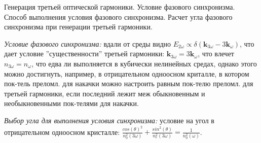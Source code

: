 
\begin{leftrules}
Генерация третьей оптической гармоники. Условие фазового синхронизма. Способ выполнения условия фазового синхронизма. Расчет угла фазового синхронизма при генерации третьей гармоники.
\end{leftrules}





\textit{Условие фазового синхронизма:} вдали от среды видно $E_{2\omega} \propto \delta(\mathbf{k}_{3\omega}-3\mathbf{k}_{\omega})$, что дает условие ''существенности'' третьей гармоники: $\mathbf{k}_{3\omega}=3\mathbf{k}_{\omega}$, что влечет $n_{3\omega}=n_{\omega}$, что едва ли выполняется в кубически нелинейных средах, однако этого можно достигнуть, например, в отрицательном одноосном криталле, в котором пок-тель преломл. для накачки можно настроить равным пок-телю преломл. для третьей гармоники, если последний лежит меж обыкновенным и необыкновенными пок-телями для накачки.


\textit{Выбор угла для выполнения условия синхронизма:} условие на угол в отрицательном одноосном кристалле: $\frac{cos(\theta)^{2}}{n_{0}^{2}(3\omega)} + \frac{sin^{2}(\theta)}{n_{e}^{2}(3\omega)} = \frac{1}{n_{0}^{2}(\omega)}$.

